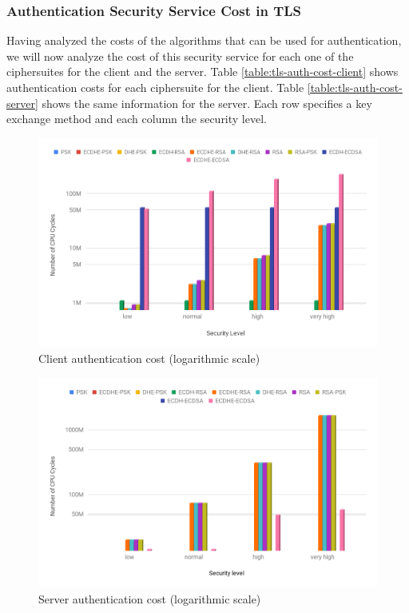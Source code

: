 \subsubsection{Authentication Security Service Cost in TLS} \label{sec:auth-cost-in-tls}

Having analyzed the costs of the algorithms that can be used for authentication, we will now analyze the cost of this security service
for each one of the ciphersuites for the client and the server. Table \ref{table:tls-auth-cost-client} shows authentication costs for each
ciphersuite for the client. Table \ref{table:tls-auth-cost-server} shows the same information for the server. Each row specifies a key
exchange method and each column the security level.

\begin{figure}
  \centering
  \includegraphics[width=1.0\textwidth]{img/tls-client-auth-cost.png}
  \centering \caption{\label{fig:tls-auth-cost-client} Client authentication cost (logarithmic scale)}
\end{figure}

\begin{figure}
  \centering
  \includegraphics[width=1.0\textwidth]{img/tls-server-auth-cost.png}
  \centering \caption{\label{fig:tls-auth-cost-server} Server authentication cost (logarithmic scale)}
\end{figure}


